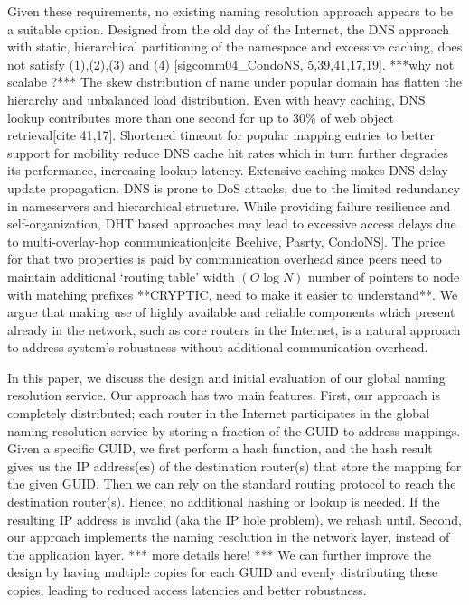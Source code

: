     Given these requirements, no existing naming resolution approach appears to be a suitable option. 
    Designed from the old day of the Internet, the DNS approach with static, hierarchical partitioning of the namespace and excessive caching, does not satisfy (1),(2),(3) and (4) [sigcomm04\_CondoNS, 5,39,41,17,19]. ***why not scalabe ?*** The skew distribution of name under popular domain has flatten the hierarchy and unbalanced load distribution. Even with heavy caching, DNS lookup contributes more than one second for up to 30\% of web object retrieval[cite 41,17]. Shortened timeout for popular mapping entries to better support for mobility reduce DNS cache hit rates which in turn further degrades its performance, increasing lookup latency. Extensive caching makes DNS delay update propagation. DNS is prone to DoS attacks, due to the limited redundancy in nameservers and hierarchical structure.
    While providing failure resilience and self-organization, DHT based approaches may lead to excessive access delays due to multi-overlay-hop communication[cite Beehive, Pasrty, CondoNS].  The price for that two properties is paid by communication overhead since peers need to maintain additional `routing table' width $(O\log{N})$ number of pointers to node with matching prefixes **CRYPTIC, need to make it easier to understand**. We argue that making use of highly available and reliable components which present already in the network, such as core routers in the Internet, is a natural approach to address system's robustness without additional communication overhead.
    
    In this paper, we discuss the design and initial evaluation of our global naming resolution service. Our approach has two main features. First, our approach is completely distributed; each router in the Internet participates in the global naming resolution service by storing a fraction of the GUID to address mappings. Given a specific GUID, we first perform a hash function, and the hash result gives us the IP address(es) of the destination router(s) that store the mapping for the given GUID. Then we can rely on the standard routing protocol to reach the destination router(s). Hence, no additional hashing or lookup is needed. If the resulting IP address is invalid (aka the IP hole problem), we rehash until. Second, our approach implements the naming resolution in the network layer, instead of the application layer. *** more details here! *** We can further improve the design by having multiple copies for each GUID and evenly distributing these copies, leading to reduced access latencies and better robustness.

